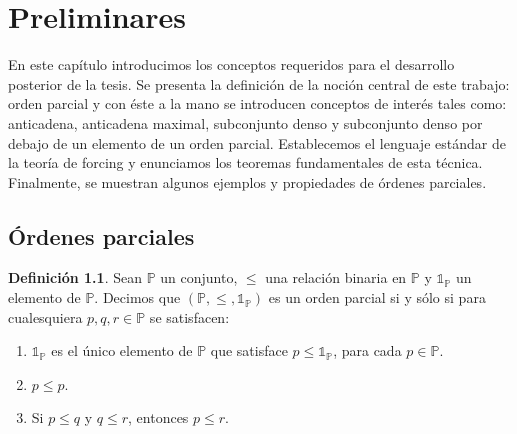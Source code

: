 \documentclass[11pt]{unam_tesis1}
\theoremstyle{MyThmStyle}
\theoremstyle{definition}
\newtheorem{definition}{Definici\'on}[chapter]
\theoremstyle{plain}
\theoremstyle{remark}
\let\leq\leqslant
\begin{document}
\begin{abstract}
Por \'ultimo, ser\'ia deseable que el lector posea cierta solvencia en los conceptos b\'asicos de la teor\'ia de conjuntos (de no ser as\'i se invita a consultar \cite{jech} y \cite{kunen} para cubrir los prerrequisitos necesarios). De este modo, nuestro trabajo podr\'a ser le\'ido de manera fluida, esperando no erosionar lo que a su vez se espera de nosotros.
\end{abstract}

   \tableofcontents


   \textarea

\chapter{Preliminares}
En este cap\'itulo introducimos los conceptos requeridos para el desarrollo posterior de la tesis. Se presenta la definici\'on de la noci\'on central de este trabajo: orden parcial y con \'este a la mano se introducen conceptos de inter\'es tales como: anticadena, anticadena maximal, subconjunto denso y subconjunto denso por debajo de un elemento de un orden parcial. Establecemos el lenguaje est\'andar de la teor\'ia de forcing y enunciamos los teoremas fundamentales de esta t\'ecnica. Finalmente, se muestran algunos ejemplos y propiedades de \'ordenes parciales.

\section{\'Ordenes parciales}

\begin{definition}
Sean $\mathbb P$ un conjunto, $\leq$ una relaci\'on binaria en $\mathbb P$ y $\mathds 1_{\mathbb P}$ un elemento de $\mathbb P$. Decimos que $(\mathbb P,\leq,\mathds{1}_{\mathbb P})$ es un orden parcial si y s\'olo si para cualesquiera $p,q,r\in \mathbb P$ se satisfacen:

\begin{enumerate}
\item $\mathds 1_{\mathbb P}$ es el \'unico elemento de $\mathbb P$ que satisface $p \leq \mathds 1_{\mathbb P}$, para cada $p \in \mathbb P$.
\item $p\leq p$.
\item Si $p\leq q$ y $q\leq r$, entonces $p\leq r$.

\end{enumerate}

\end{definition}
\end{document}

